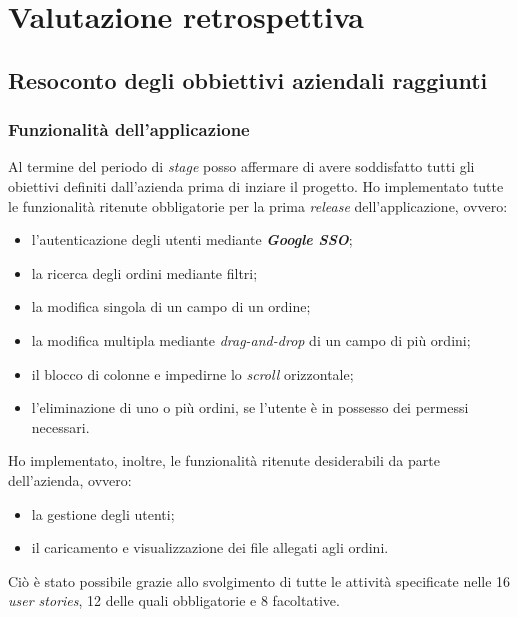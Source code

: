 
\chapter{Valutazione retrospettiva}
\label{cap:valutazione}
\section{Resoconto degli obbiettivi aziendali raggiunti}

\subsection{Funzionalità dell'applicazione}
Al termine del periodo di \emph{stage} posso affermare di avere soddisfatto tutti gli obiettivi definiti dall'azienda prima di inziare il progetto.
Ho implementato tutte le funzionalità ritenute obbligatorie per la prima \emph{release} dell'applicazione, ovvero:
\begin{itemize}
  \item l'autenticazione degli utenti mediante \emph{\textbf{Google SSO}};
  \item la ricerca degli ordini mediante filtri;
  \item la modifica singola di un campo di un ordine;
  \item la modifica multipla mediante \emph{drag-and-drop} di un campo di più ordini;
  \item il blocco di colonne e impedirne lo \emph{scroll} orizzontale;
  \item l'eliminazione di uno o più ordini, se l'utente è in possesso dei permessi necessari.
\end{itemize}

Ho implementato, inoltre, le funzionalità ritenute desiderabili da parte dell'azienda, ovvero:
\begin{itemize}
  \item la gestione degli utenti;
  \item il caricamento e visualizzazione dei file allegati agli ordini.
\end{itemize}

Ciò è stato possibile grazie allo svolgimento di tutte le attività specificate nelle 16 \emph{user stories}, 12 delle quali obbligatorie e 8 facoltative. 

